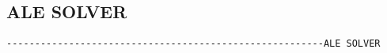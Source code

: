 \subsection{ALE SOLVER}
\begin{verbatim}
--------------------------------------------------------ALE SOLVER
\end{verbatim}

